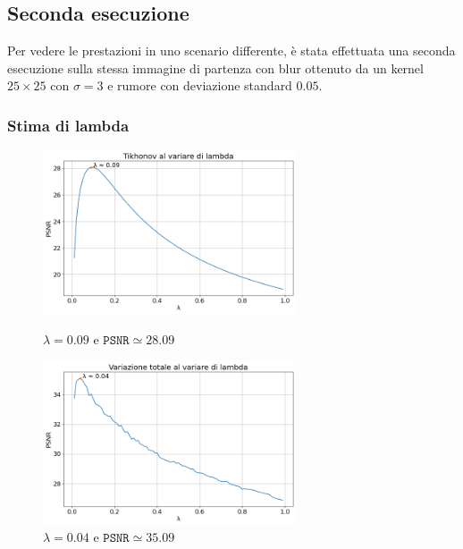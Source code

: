 \documentclass[11pt]{article}
\begin{document}
\subsection{Seconda esecuzione}
Per vedere le prestazioni in uno scenario differente, è stata effettuata una seconda esecuzione sulla stessa immagine di partenza con blur ottenuto da un kernel $25 \times 25$ con $\sigma=3$ e rumore con deviazione standard $0.05$.

\subsubsection{Stima di lambda}
\begin{figure}[H]
    \centering
    \begin{minipage}{0.45\textwidth}
        \centering
        \includegraphics[width=7.5cm]{esecuzione/2/tikhonov_lambda.png}
        \caption{$\lambda=0.09$ e $\texttt{PSNR} \simeq 28.09$}
        \label{fig:tikhonov_lambda2}
    \end{minipage}\hfill
    \begin{minipage}{0.45\textwidth}
        \centering
        \includegraphics[width=7.5cm]{esecuzione/2/tv_lambda.png}
        \caption{$\lambda=0.04$ e $\texttt{PSNR} \simeq 35.09$}
        \label{fig:tv_lambda2}
    \end{minipage}
\end{figure}
\end{document}
